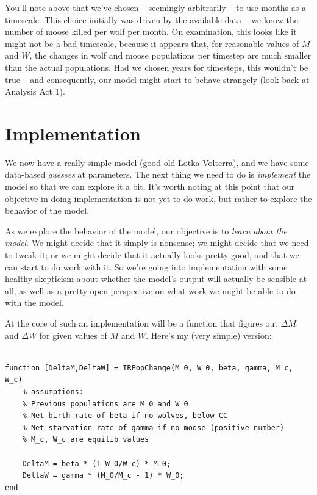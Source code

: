 \documentclass{tufte-handout}
\begin{document}
You'll note above that we've chosen -- seemingly arbitrarily -- to use months as a timescale.  This choice initially was driven by the available data -- we know the number of moose killed per wolf per month.  On examination, this looks like it might not be a bad timescale, because it appears that, for reasonable values of $M$ and $W$, the changes in wolf and moose populations per timestep are much smaller than the actual populations.  Had we chosen years for timesteps, this wouldn't be true -- and consequently, our model might start to behave strangely (look back at Analysis Act 1).

\section{Implementation}

We now have a really simple model (good old Lotka-Volterra), and we have some data-based {\it guesses} at parameters.  The next thing we need to do is {\it implement} the model so that we can explore it a bit.  It's worth noting at this point that our objective in doing implementation is not yet to do work, but rather to explore the behavior of the model.   

As we explore the behavior of the model, our objective is to {\it learn about the model}.  We might 
decide that it simply is nonsense; we might decide that we need to tweak it; or we might decide that it 
actually looks pretty good, and that we can start to do work with it.  So we're going into implementation 
with some healthy skepticism about whether the model's output will actually be sensible at all, as well
as a pretty open perspective on what work we might be able to do with the model.

At the core of such an implementation will be a function that figures out $\Delta M$ and $\Delta W$ for given values of $M$ and $W$.  Here's my (very simple) version:

\begin{verbatim}

function [DeltaM,DeltaW] = IRPopChange(M_0, W_0, beta, gamma, M_c, W_c)
    % assumptions:
    % Previous populations are M_0 and W_0
    % Net birth rate of beta if no wolves, below CC
    % Net starvation rate of gamma if no moose (positive number)
    % M_c, W_c are equilib values
 
    DeltaM = beta * (1-W_0/W_c) * M_0;
    DeltaW = gamma * (M_0/M_c - 1) * W_0;
end
 
\end{verbatim}
\end{document}
